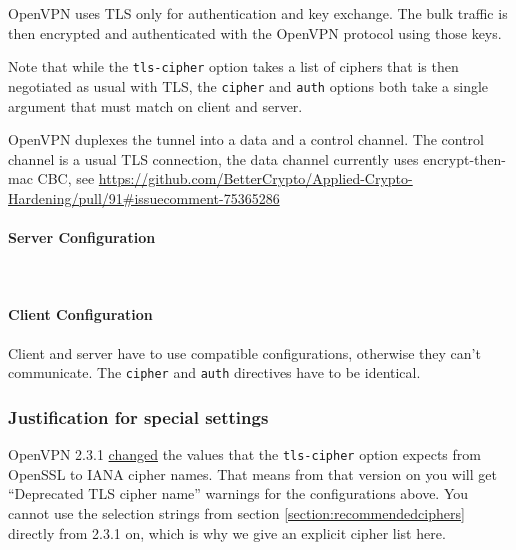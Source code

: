 OpenVPN uses TLS only for authentication and key exchange. The
bulk traffic is then encrypted and authenticated with the OpenVPN
protocol using those keys.

Note that while the \verb|tls-cipher| option takes a list of ciphers
that is then negotiated as usual with TLS, the \verb|cipher|
and \verb|auth| options both take a single argument that must match on
client and server.

OpenVPN duplexes the tunnel into a data and a control channel. The control
channel is a usual TLS connection, the data channel currently uses 
encrypt-then-mac CBC, see \url{https://github.com/BetterCrypto/Applied-Crypto-Hardening/pull/91#issuecomment-75365286}


\paragraph{Server Configuration}
~\\

\paragraph{Client Configuration}
Client and server have to use compatible configurations, otherwise they can't communicate.
The \verb|cipher| and \verb|auth| directives have to be identical.


\subsubsection{Justification for special settings}
OpenVPN 2.3.1 \href{http://sourceforge.net/p/openvpn/openvpn/ci/3b23b18dddb8f8f4a6ac6959b844b63356b59e87}{changed}
the values that the \verb|tls-cipher| option expects from OpenSSL to
IANA cipher names. That means from that version on you will get
``Deprecated TLS cipher name'' warnings for the configurations above.
You cannot use the selection strings from section
\ref{section:recommendedciphers} directly from 2.3.1 on, which
is why we give an explicit cipher list here.

